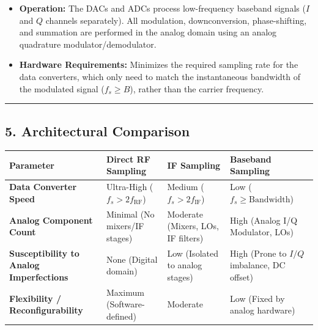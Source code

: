 \documentclass[
]{article}
\providecommand{\tightlist}{%
  \setlength{\itemsep}{0pt}\setlength{\parskip}{0pt}}
\begin{document}
\begin{itemize}
\tightlist
\item
  \textbf{Operation:} The DACs and ADCs process low-frequency baseband
  signals (\(I\) and \(Q\) channels separately). All modulation,
  downconversion, phase-shifting, and summation are performed in the
  analog domain using an analog quadrature modulator/demodulator.
\item
  \textbf{Hardware Requirements:} Minimizes the required sampling rate
  for the data converters, which only need to match the instantaneous
  bandwidth of the modulated signal (\(f_s \ge B\)), rather than the
  carrier frequency.
\end{itemize}

\begin{center}\rule{0.5\linewidth}{0.5pt}\end{center}

\subsection{5. Architectural Comparison}\label{architectural-comparison}

\begin{longtable}[]{@{}
  >{\raggedright\arraybackslash}p{}
  >{\raggedright\arraybackslash}p{}
  >{\raggedright\arraybackslash}p{}
  >{\raggedright\arraybackslash}p{}@{}}
\toprule\noalign{}
\begin{minipage}[b]{\linewidth}\raggedright
Parameter
\end{minipage} & \begin{minipage}[b]{\linewidth}\raggedright
Direct RF Sampling
\end{minipage} & \begin{minipage}[b]{\linewidth}\raggedright
IF Sampling
\end{minipage} & \begin{minipage}[b]{\linewidth}\raggedright
Baseband Sampling
\end{minipage} \\
\midrule\noalign{}
\endhead
\bottomrule\noalign{}
\endlastfoot
\textbf{Data Converter Speed} & Ultra-High (\(f_s > 2f_{\text{RF}}\)) &
Medium (\(f_s > 2f_{\text{IF}}\)) & Low
(\(f_s \ge \text{Bandwidth}\)) \\
\textbf{Analog Component Count} & Minimal (No mixers/IF stages) &
Moderate (Mixers, LOs, IF filters) & High (Analog I/Q Modulator, LOs) \\
\textbf{Susceptibility to Analog Imperfections} & None (Digital domain)
& Low (Isolated to analog stages) & High (Prone to \(I/Q\) imbalance, DC
offset) \\
\textbf{Flexibility / Reconfigurability} & Maximum (Software-defined) &
Moderate & Low (Fixed by analog hardware) \\
\end{longtable}
\end{document}
